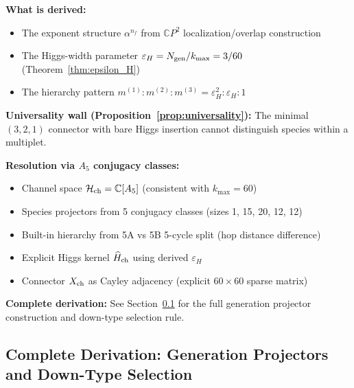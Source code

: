 \begin{tcolorbox}[colback=yellow!5!white, colframe=orange!60!black,
  title=Mass Sector Status (Complete Assessment)]

\textbf{What is derived:}
\begin{itemize}[nosep]
\item The exponent structure $\alpha^{n_f}$ from $\mathbb{C}P^2$ localization/overlap construction
\item The Higgs-width parameter $\varepsilon_H = N_{\rm gen}/k_{\max} = 3/60$ (Theorem~\ref{thm:epsilon_H})
\item The hierarchy pattern $m^{(1)} : m^{(2)} : m^{(3)} = \varepsilon_H^2 : \varepsilon_H : 1$
\end{itemize}

\textbf{Universality wall (Proposition~\ref{prop:universality}):} The minimal $(3,2,1)$ connector 
with bare Higgs insertion cannot distinguish species within a multiplet.

\textbf{Resolution via $A_5$ conjugacy classes:}
\begin{itemize}[nosep]
\item Channel space $\mathcal{H}_{\rm ch} = \mathbb{C}[A_5]$ (consistent with $k_{\max} = 60$)
\item Species projectors from 5 conjugacy classes (sizes 1, 15, 20, 12, 12)
\item Built-in hierarchy from 5A vs 5B 5-cycle split (hop distance difference)
\item Explicit Higgs kernel $\widehat{H}_{\rm ch}$ using derived $\varepsilon_H$
\item Connector $X_{\rm ch}$ as Cayley adjacency (explicit $60 \times 60$ sparse matrix)
\end{itemize}

\textbf{Complete derivation:} See Section~\ref{app:species_derivation} for the full 
generation projector construction and down-type selection rule.
\end{tcolorbox}


\subsection{Complete Derivation: Generation Projectors and Down-Type Selection}
\label{app:species_derivation}

